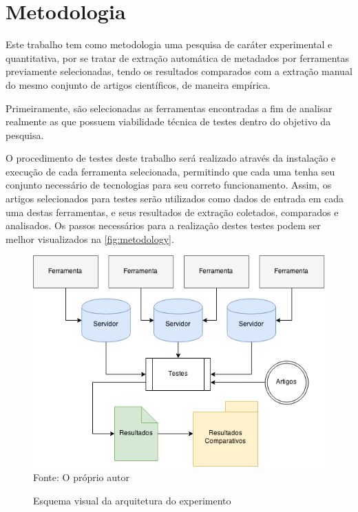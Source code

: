 
\chapter{Metodologia}
\label{cha:methodology}

Este trabalho tem como metodologia uma pesquisa de caráter experimental e quantitativa, por se tratar de extração automática de metadados por ferramentas previamente selecionadas, tendo os resultados comparados com a extração manual do mesmo conjunto de artigos científicos, de maneira empírica.


Primeiramente, são selecionadas as ferramentas encontradas a fim de analisar realmente as que possuem viabilidade técnica de testes dentro do objetivo da pesquisa. 


O procedimento de testes deste trabalho será realizado através da instalação e execução de cada ferramenta selecionada, permitindo que cada uma tenha seu conjunto necessário de tecnologias para seu correto funcionamento. Assim, os artigos selecionados para testes serão utilizados como dados de entrada em cada uma destas ferramentas, e seus resultados de extração coletados, comparados e analisados. Os passos necessários para a realização destes testes podem ser melhor visualizados na \autoref{fig:metodology}.

\begin{figure}[h!]
    \centering
    \caption{Esquema visual da arquitetura do experimento}
    \label{fig:metodology}
    \includegraphics[width=0.8\linewidth]{./assets/images/metodology}
    \center\footnotesize{Fonte: O próprio autor}
\end{figure}


